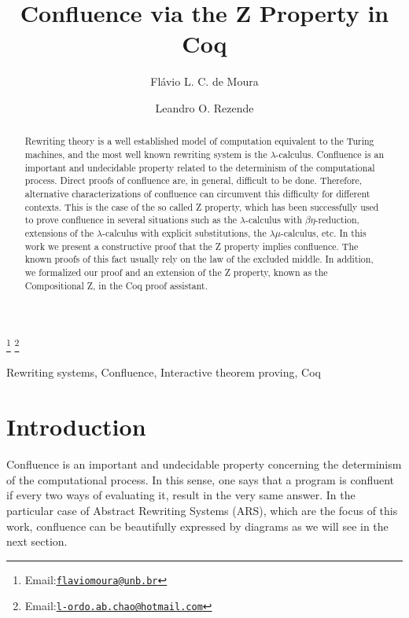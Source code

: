 \documentclass{entcs}
\begin{document}
\begin{frontmatter}
  \title{Confluence via the Z Property in Coq}
  \author{Flávio L. C. de Moura}
  \author{Leandro O. Rezende}
  \address{Departamento de Ciência da Computação, Universidade de Brasília, Brasília, Brazil}
  \thanks[flaviomoura]{Email:\href{flaviomoura@unb.br}{\texttt{\normalshape flaviomoura@unb.br}}} 
  \thanks[leandro]{Email:\href{l-ordo.ab.chao@hotmail.com}{\texttt{\normalshape l-ordo.ab.chao@hotmail.com}}}
  
\begin{abstract}
  Rewriting theory is a well established model of computation
  equivalent to the Turing machines, and the most well known rewriting
  system is the $\lambda$-calculus. Confluence is an important and
  undecidable property related to the determinism of the computational
  process. Direct proofs of confluence are, in general, difficult to
  be done. Therefore, alternative characterizations of confluence can
  circumvent this difficulty for different contexts. This is the case
  of the so called Z property, which has been successfully used to
  prove confluence in several situations such as the
  $\lambda$-calculus with $\beta\eta$-reduction, extensions of the
  $\lambda$-calculus with explicit substitutions, the
  $\lambda\mu$-calculus, etc. In this work we present a constructive
  proof that the Z property implies confluence. The known proofs of
  this fact usually rely on the law of the excluded middle. In
  addition, we formalized our proof and an extension of the Z
  property, known as the Compositional Z, in the Coq proof assistant.
\end{abstract}

\begin{keyword}
  Rewriting systems, Confluence, Interactive theorem proving, Coq
\end{keyword}
\end{frontmatter}

\section{Introduction}



Confluence is an important and undecidable property concerning the
determinism of the computational process. In this sense, one says that
a program is confluent if every two ways of evaluating it, result in
the very same answer. In the particular case of Abstract Rewriting
Systems (ARS), which are the focus of this work, confluence can be
beautifully expressed by diagrams as we will see in the next section.
\end{document}
